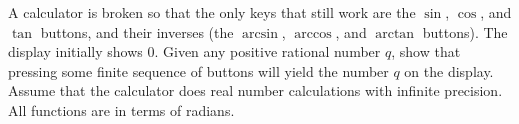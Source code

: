 A calculator is broken so that the only keys that still work are the $ \sin$,  $ \cos$,  and $ \tan$ buttons, and their inverses (the $ \arcsin$,  $ \arccos$,  and $ \arctan$ buttons). The display initially shows $ 0$. Given any positive rational number $ q$,  show that pressing some finite sequence of buttons will yield the number $ q$ on the display. Assume that the calculator does real number calculations with infinite precision. All functions are in terms of radians.